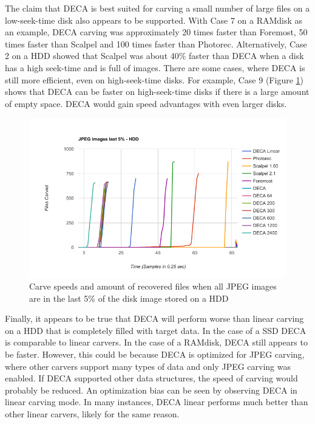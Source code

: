 \documentclass[final,5p,times,twocolumn,authoryear]{elsarticle}
\begin{document}
The claim that DECA is best suited for carving a small number of large files on a low-seek-time disk also appears to be supported. With Case 7 on a RAMdisk as an example, DECA carving was approximately 20 times faster than Foremost, 50 times faster than Scalpel and 100 times faster than Photorec. Alternatively, Case 2 on a HDD showed that Scalpel was about 40\% faster than DECA when a disk has a high seek-time and is full of images. There are some cases, where DECA is still more efficient, even on high-seek-time disks. For example, Case 9 (Figure \ref{fig:last5hdd}) shows that DECA can be faster on high-seek-time disks if there is a large amount of empty space. DECA would gain speed advantages with even larger disks.

\begin{figure}
	\centerline{\includegraphics[width=0.9\linewidth]{figures/last5hdd.png}}
	\caption{Carve speeds and amount of recovered files when all JPEG images are in the last 5\% of the disk image stored on a HDD}
	\label{fig:last5hdd}
\end{figure}

Finally, it appears to be true that DECA will perform worse than linear carving on a HDD that is completely filled with target data. In the case of a SSD DECA is comparable to linear carvers. In the case of a RAMdisk, DECA still appears to be faster. However, this could be because DECA is optimized for JPEG carving, where other carvers support many types of data and only JPEG carving was enabled. If DECA supported other data structures, the speed of carving would probably be reduced. An optimization bias can be seen by observing DECA in linear carving mode. In many instances, DECA linear performs much better than other linear carvers, likely for the same reason.
\end{document}
